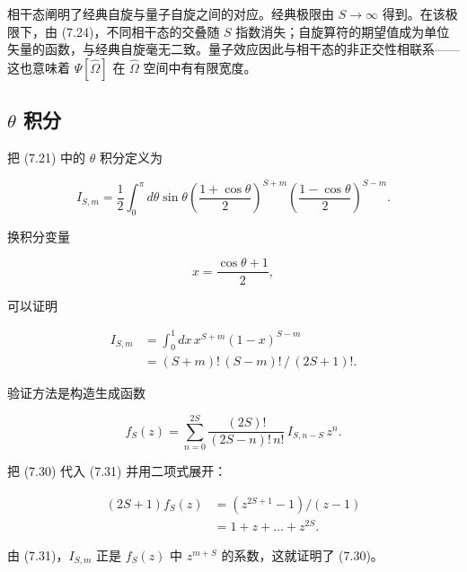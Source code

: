 相干态阐明了经典自旋与量子自旋之间的对应。经典极限由 $S \rightarrow \infty$ 得到。在该极限下，由 (7.24)，不同相干态的交叠随 $S$ 指数消失；自旋算符的期望值成为单位矢量的函数，与经典自旋毫无二致。量子效应因此与相干态的非正交性相联系——这也意味着 $\Psi[\hat{\Omega}]$ 在 $\hat{\Omega}$ 空间中有有限宽度。

\subsection{$\theta$ 积分}

把 (7.21) 中的 $\theta$ 积分定义为

\begin{equation*}
I _ {S, m} = \frac {1}{2} \int_ {0} ^ {\pi} d \theta \sin \theta \left( \frac {1 + \cos \theta}{2} \right) ^ {S + m} \left( \frac {1 - \cos \theta}{2} \right) ^ {S - m}.
\tag{7.28}
\end{equation*}

换积分变量

\begin{equation*}
x = \frac {\cos \theta + 1}{2} ,
\tag{7.29}
\end{equation*}

可以证明

\begin{align*}
I _ {S, m} & = \int_ {0} ^ {1} d x \, x ^ {S + m} ( 1 - x ) ^ {S - m}\\
& = ( S + m )! \, ( S - m )! \, / \, ( 2 S + 1 )! .
\tag{7.30}
\end{align*}

验证方法是构造生成函数

\begin{equation*}
f _ {S} ( z ) = \sum_ {n = 0} ^ {2 S} \frac {( 2 S ) !}{( 2 S - n )! \, n !} \, I _ {S, n - S} \, z ^ {n}.
\tag{7.31}
\end{equation*}

把 (7.30) 代入 (7.31) 并用二项式展开：

\begin{align*}
( 2 S + 1 ) f _ {S} ( z ) & = ( z ^ {2 S + 1} - 1 ) / ( z - 1 )\\
& = 1 + z + \ldots + z ^ {2 S} .
\tag{7.32}
\end{align*}

由 (7.31)，$I_{S,m}$ 正是 $f_{S}(z)$ 中 $z^{m + S}$ 的系数，这就证明了 (7.30)。

